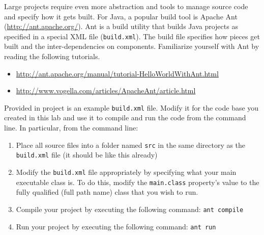 \documentclass[12pt]{scrartcl}
\begin{document}
Large projects require even more abstraction and tools to manage source code 
and specify how it gets built.  For Java, a popular build tool is Apache Ant 
(\url{http://ant.apache.org/}).  Ant is a build utility that builds Java projects as 
specified in a special XML file (\texttt{build.xml}).  The build file specifies 
how pieces get built and the inter-dependencies on components.  Familiarize 
yourself with Ant by reading the following tutorials.
\begin{itemize}
  \item \url{http://ant.apache.org/manual/tutorial-HelloWorldWithAnt.html}
  \item \url{http://www.vogella.com/articles/ApacheAnt/article.html}
\end{itemize}
Provided in project is an example \texttt{build.xml} file.  Modify it for the 
code base you created in this lab and use it to compile and run the code from 
the command line.  In particular, from the command line:
\begin{enumerate}
  \item Place all source files into a folder named \texttt{src} in the
	same directory as the \texttt{build.xml} file (it should be like this already)
  \item Modify the \texttt{build.xml} file appropriately by specifying 
    what your main executable class is.  To do this, modify the \texttt{main.class}
    property's value to the fully qualified (full path name) class that you wish to run.
  \item Compile your project by executing the following command:
	\texttt{ant compile}
  \item Run your project by executing the following command:
	\texttt{ant run}
\end{enumerate}
\end{document}
